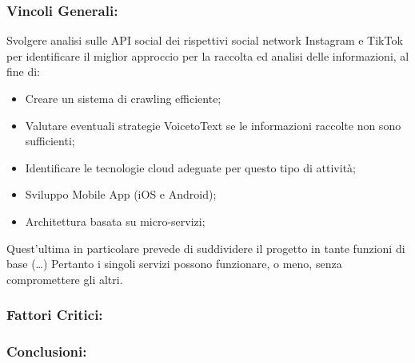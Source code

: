 \subsubsection{Vincoli Generali:}
Svolgere analisi sulle API social dei rispettivi social network Instagram e TikTok per identificare il miglior approccio per la raccolta ed analisi delle informazioni, al fine di:
\begin{itemize}
	\item Creare un sistema di crawling efficiente;
	\item Valutare eventuali strategie VoicetoText se le informazioni raccolte non sono sufficienti;
	\item Identificare le tecnologie cloud adeguate per questo tipo di attività;
	\item Sviluppo Mobile App (iOS e Android);
	\item Architettura basata su micro-servizi; 
\end{itemize}
Quest’ultima in particolare prevede di suddividere il progetto in tante funzioni di base (…) Pertanto i singoli servizi possono funzionare, o meno, senza compromettere gli altri.


\subsubsection{Fattori Critici:}

\subsubsection{Conclusioni:}
